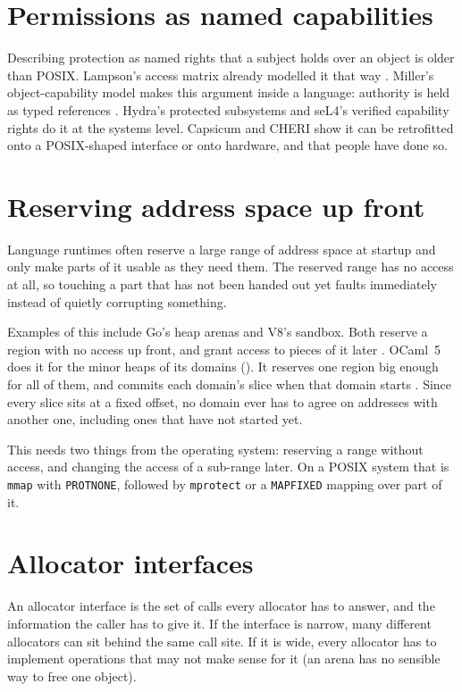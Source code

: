 \documentclass[12pt]{report}
\newcommand{\fullref}[1]{\Cref{#1}}
\renewcommand{\_}{\origunderscore\allowbreak}
\begin{document}
\section{Permissions as named capabilities}
\label{sec:capability-protection}
Describing protection as named rights that a subject holds over an object is older than POSIX. Lampson's access matrix already modelled it that way \cite{lampson1974protection}. Miller's object-capability model makes this argument inside a language: authority is held as typed references \cite{miller2006robustcomposition}. Hydra's protected subsystems \cite{cohen1975hydra} and seL4's verified capability rights \cite{elkaduwe2008sel4} do it at the systems level. Capsicum \cite{watson2010capsicum} and CHERI \cite{woodruff2014cheri} show it can be retrofitted onto a POSIX-shaped interface or onto hardware, and that people have done so.

\section{Reserving address space up front}
\label{sec:reserve-commit}
Language runtimes often reserve a large range of address space at startup and only make parts of it usable as they need them. The reserved range has no access at all, so touching a part that has not been handed out yet faults immediately instead of quietly corrupting something.

Examples of this include Go's heap arenas and V8's sandbox. Both reserve a region with no access up front, and grant access to pieces of it later \cite{knyszek2019scaling,gross2024sandbox}. OCaml~5 does it for the minor heaps of its domains (\fullref{sec:bg-languages}). It reserves one region big enough for all of them, and commits each domain's slice when that domain starts \cite{ocaml2025source}. Since every slice sits at a fixed offset, no domain ever has to agree on addresses with another one, including ones that have not started yet.

This needs two things from the operating system: reserving a range without access, and changing the access of a sub-range later. On a POSIX system that is \texttt{mmap} with \texttt{PROT\_NONE}, followed by \texttt{mprotect} or a \texttt{MAP\_FIXED} mapping over part of it.

\section{Allocator interfaces}
\label{sec:allocator-vexation}
An allocator interface is the set of calls every allocator has to answer, and the information the caller has to give it. If the interface is narrow, many different allocators can sit behind the same call site. If it is wide, every allocator has to implement operations that may not make sense for it (an arena has no sensible way to free one object).
\end{document}
